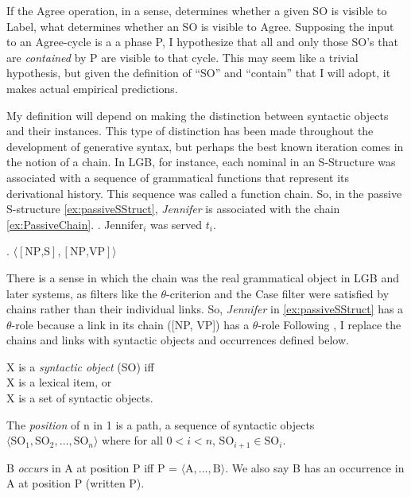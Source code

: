 \documentclass[MilwayThesis]{subfiles}
\begin{document}
If the Agree operation, in a sense, determines whether a given SO is visible to Label, what determines whether an SO is visible to Agree.
Supposing the input to an Agree-cycle is a a phase P, I hypothesize that all and only those SO's that are \textit{contained} by P are visible to that cycle.
This may seem like a trivial hypothesis, but given the definition of ``SO'' and ``contain'' that I will adopt, it makes actual empirical predictions.

My definition will depend on making the distinction between syntactic objects and their instances.
This type of distinction has been made throughout the development of generative syntax, but perhaps the best known iteration comes in the notion of a chain.
In LGB, for instance, each nominal in an S-Structure was associated with a sequence of grammatical functions that represent its derivational history.
This sequence was called a function chain.
So, in the passive S-structure \cref{ex:passiveSStruct}, \textit{Jennifer} is associated with the chain \cref{ex:PassiveChain}.
\ex.\label{ex:passiveSStruct} Jennifer$_i$ was served $t_i$.

\ex.\label{ex:PassiveChain} $\langle\left[\text{NP,S}\right], \left[\text{NP,VP}\right]\rangle$

There is a sense in which the chain was the real grammatical object in LGB and later systems, as filters like the $\theta$-criterion and the Case filter were satisfied by chains rather than their individual links.
So, \textit{Jennifer} in \cref{ex:passiveSStruct} has a $\theta$-role because a link in its chain ([NP, VP]) has a $\theta$-role
Following \textcite{collins2016formalization}, I replace the chains and links with syntactic objects and occurrences defined below.
\begin{defn}
  X is a \textit{syntactic object} (SO) iff\\
    X is a lexical item, or\\
    X is a set of syntactic objects. \parencite[Modified from][]{collins2016formalization}
  \label{def:so}
\end{defn}
\begin{defn}
  The \textit{position} of n in 1 is a path, a sequence of syntactic objects $\langle\text{SO}_1,\text{SO}_2,\dots,\text{SO}_n\rangle$ where for all $0 < i < n$, $\text{SO}_{i + 1} \in \text{SO}_i$. \parencite{collins2016formalization}
  \label{def:position}
\end{defn}
\begin{defn}
  B \textit{occurs} in A at position P iff P = $\langle\text{A},\dots,\text{B}\rangle$. We also say B has an occurrence in A at position P (written P).
  \label{def:occurrence}
\end{defn}
\end{document}
